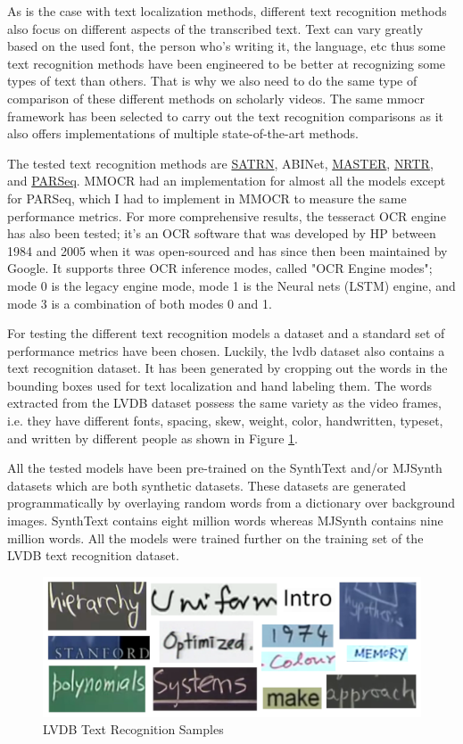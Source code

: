 As is the case with text localization methods, different text recognition methods also focus on different aspects of the transcribed text. Text can vary greatly based on the used font, the person who's writing it, the language, etc thus some text recognition methods have been engineered to be better at recognizing some types of text than others. That is why we also need to do the same type of comparison of these different methods on scholarly videos. The same \gls{mmocr} framework has been selected to carry out the text recognition comparisons as it also offers implementations of multiple state-of-the-art methods.

The tested text recognition methods are \hyperref[satrn]{SATRN}, ABINet, \hyperref[master]{MASTER}, \hyperref[nrtr]{NRTR}, and \hyperref[parseq]{PARSeq}.
MMOCR had an implementation for almost all the models except for PARSeq, which I had to implement in MMOCR to measure the same performance metrics.
For more comprehensive results, the tesseract OCR engine has also been tested; it's an OCR software that was developed by HP between 1984 and 2005 when it was open-sourced and has since then been maintained by Google. It supports three OCR inference modes, called "OCR Engine modes"; mode 0 is the legacy engine mode, mode 1 is the Neural nets (LSTM) engine, and mode 3 is a combination of both modes 0 and 1.

For testing the different text recognition models a dataset and a standard set of performance metrics have been chosen. Luckily, the \gls{lvdb} dataset also contains a text recognition dataset. It has been generated by cropping out the words in the bounding boxes used for text localization and hand labeling them. The words extracted from the LVDB dataset possess the same variety as the video frames, i.e. they have different fonts, spacing, skew, weight, color, handwritten, typeset, and written by different people as shown in Figure \ref{meth:lvdb_textred_collage}.

All the tested models have been pre-trained on the SynthText \cite{gupta_synthetic_2016} and/or MJSynth \cite{jaderberg_synthetic_2014} datasets which are both synthetic datasets. These datasets are generated programmatically by overlaying random words from a dictionary over background images. SynthText contains eight million words whereas MJSynth contains nine million words. All the models were trained further on the training set of the LVDB text recognition dataset.

\begin{figure}[H]
        \centering
        \includegraphics[width=140mm]{figures/lvdb_textrec_collage.png}
        \caption{LVDB Text Recognition Samples}
        \label{meth:lvdb_textred_collage}
\end{figure}

